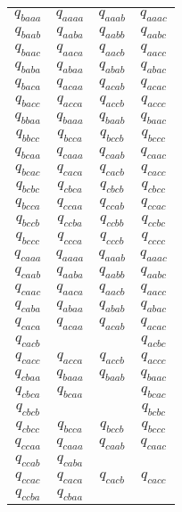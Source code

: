 \begin{enumerate}
\begin{latin}
\begin{longtable}{c|ccc}
$q_{baaa}$ & $q_{aaaa}$ & $q_{aaab}$ & $q_{aaac}$ \\
$q_{baab}$ & $q_{aaba}$ & $q_{aabb}$ & $q_{aabc}$ \\
$q_{baac}$ & $q_{aaca}$ & $q_{aacb}$ & $q_{aacc}$ \\
$q_{baba}$ & $q_{abaa}$ & $q_{abab}$ & $q_{abac}$ \\
$q_{baca}$ & $q_{acaa}$ & $q_{acab}$ & $q_{acac}$ \\
$q_{bacc}$ & $q_{acca}$ & $q_{accb}$ & $q_{accc}$ \\
$q_{bbaa}$ & $q_{baaa}$ & $q_{baab}$ & $q_{baac}$ \\
$q_{bbcc}$ & $q_{bcca}$ & $q_{bccb}$ & $q_{bccc}$ \\
$q_{bcaa}$ & $q_{caaa}$ & $q_{caab}$ & $q_{caac}$ \\
$q_{bcac}$ & $q_{caca}$ & $q_{cacb}$ & $q_{cacc}$ \\
$q_{bcbc}$ & $q_{cbca}$ & $q_{cbcb}$ & $q_{cbcc}$ \\
$q_{bcca}$ & $q_{ccaa}$ & $q_{ccab}$ & $q_{ccac}$ \\
$q_{bccb}$ & $q_{ccba}$ & $q_{ccbb}$ & $q_{ccbc}$ \\
$q_{bccc}$ & $q_{ccca}$ & $q_{cccb}$ & $q_{cccc}$ \\
$q_{caaa}$ & $q_{aaaa}$ & $q_{aaab}$ & $q_{aaac}$ \\
$q_{caab}$ & $q_{aaba}$ & $q_{aabb}$ & $q_{aabc}$ \\
$q_{caac}$ & $q_{aaca}$ & $q_{aacb}$ & $q_{aacc}$ \\
$q_{caba}$ & $q_{abaa}$ & $q_{abab}$ & $q_{abac}$ \\
$q_{caca}$ & $q_{acaa}$ & $q_{acab}$ & $q_{acac}$ \\
$q_{cacb}$ &  &  & $q_{acbc}$ \\
$q_{cacc}$ & $q_{acca}$ & $q_{accb}$ & $q_{accc}$ \\
$q_{cbaa}$ & $q_{baaa}$ & $q_{baab}$ & $q_{baac}$ \\
$q_{cbca}$ & $q_{bcaa}$ &  & $q_{bcac}$ \\
$q_{cbcb}$ &  &  & $q_{bcbc}$ \\
$q_{cbcc}$ & $q_{bcca}$ & $q_{bccb}$ & $q_{bccc}$ \\
$q_{ccaa}$ & $q_{caaa}$ & $q_{caab}$ & $q_{caac}$ \\
$q_{ccab}$ & $q_{caba}$ &  &  \\
$q_{ccac}$ & $q_{caca}$ & $q_{cacb}$ & $q_{cacc}$ \\
$q_{ccba}$ & $q_{cbaa}$ &  &  \\

\end{longtable}
\end{latin}
\end{enumerate}

